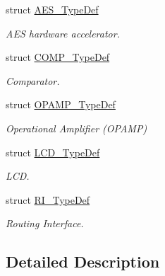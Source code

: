 \begin{DoxyCompactItemize}
struct \hyperlink{struct_a_e_s___type_def}{A\-E\-S\-\_\-\-Type\-Def}
\begin{DoxyCompactList}\small\item\em A\-E\-S hardware accelerator. \end{DoxyCompactList}\item 
struct \hyperlink{struct_c_o_m_p___type_def}{C\-O\-M\-P\-\_\-\-Type\-Def}
\begin{DoxyCompactList}\small\item\em Comparator. \end{DoxyCompactList}\item 
struct \hyperlink{struct_o_p_a_m_p___type_def}{O\-P\-A\-M\-P\-\_\-\-Type\-Def}
\begin{DoxyCompactList}\small\item\em Operational Amplifier (O\-P\-A\-M\-P) \end{DoxyCompactList}\item 
struct \hyperlink{struct_l_c_d___type_def}{L\-C\-D\-\_\-\-Type\-Def}
\begin{DoxyCompactList}\small\item\em L\-C\-D. \end{DoxyCompactList}\item 
struct \hyperlink{struct_r_i___type_def}{R\-I\-\_\-\-Type\-Def}
\begin{DoxyCompactList}\small\item\em Routing Interface. \end{DoxyCompactList}\end{DoxyCompactItemize}


\subsection{Detailed Description}
